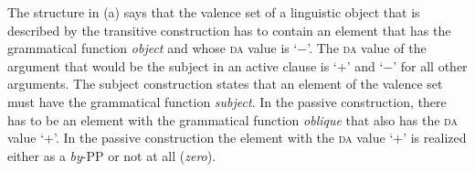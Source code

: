 The structure in (a) says that the valence set of a linguistic object that is described by the transitive construction has to contain an element
that has the grammatical function \emph{object} and whose \textsc{da} value is `$-$'. The \textsc{da} value of the argument that would be the subject in an active
clause is `+' and `$-$' for all other arguments. The subject construction states that an element of the valence set must have the grammatical function
\emph{subject}. In the passive construction, there has to be an element with the grammatical
function \emph{oblique} that also has the \textsc{da} value `+'.
In the passive construction the element with the \textsc{da} value `+' is realized either as a
\emph{by}-PP or not at all (\emph{zero}).

